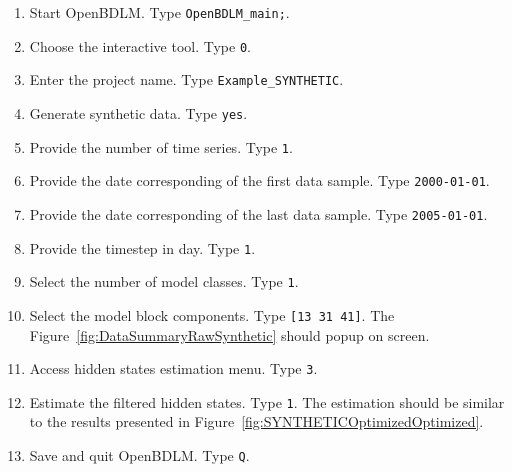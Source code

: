 \begin{enumerate}
\item Start OpenBDLM. Type \colorbox{light-gray}{\lstinline[basicstyle = \mlttfamily \small, backgroundcolor = \color{light-gray}]!OpenBDLM_main;!}.
\item Choose the interactive tool. Type \colorbox{light-gray}{\lstinline[basicstyle = \mlttfamily \small, backgroundcolor = \color{light-gray}]!0!}.
\item Enter the project name. Type \colorbox{light-gray}{\lstinline[basicstyle = \mlttfamily \small, backgroundcolor = \color{light-gray}]!Example_SYNTHETIC!}. 
\item Generate synthetic data. Type \colorbox{light-gray}{\lstinline[basicstyle = \mlttfamily \small, backgroundcolor = \color{light-gray}]!yes!}. 
\item Provide the number of time series. Type \colorbox{light-gray}{\lstinline[basicstyle = \mlttfamily \small, backgroundcolor = \color{light-gray}]!1!}.
\item Provide  the date corresponding of the first data sample. Type \colorbox{light-gray}{\lstinline[basicstyle = \mlttfamily \small, backgroundcolor = \color{light-gray}]!2000-01-01!}.
\item Provide  the date corresponding of the last data sample. Type \colorbox{light-gray}{\lstinline[basicstyle = \mlttfamily \small, backgroundcolor = \color{light-gray}]!2005-01-01!}.
\item Provide  the timestep in day. Type \colorbox{light-gray}{\lstinline[basicstyle = \mlttfamily \small, backgroundcolor = \color{light-gray}]!1!}.
\item Select the number of model classes. Type \colorbox{light-gray}{\lstinline[basicstyle = \mlttfamily \small, backgroundcolor = \color{light-gray}]!1!}. 
\item Select the model block components. Type \colorbox{light-gray}{\lstinline[basicstyle = \mlttfamily \small, backgroundcolor = \color{light-gray}]![13 31 41]!}. The Figure~\ref{fig:DataSummaryRawSynthetic} should popup on screen.
\item Access hidden states estimation menu. Type \colorbox{light-gray}{\lstinline[basicstyle = \mlttfamily \small, backgroundcolor = \color{light-gray}]!3!}. 
\item Estimate the filtered hidden states. Type \colorbox{light-gray}{\lstinline[basicstyle = \mlttfamily \small, backgroundcolor = \color{light-gray}]!1!}. The estimation should be similar to the results presented in Figure~\ref{fig:SYNTHETICOptimizedOptimized}.
\item Save and quit OpenBDLM. Type \colorbox{light-gray}{\lstinline[basicstyle = \mlttfamily \small, backgroundcolor = \color{light-gray}]!Q!}.
\end{enumerate}



